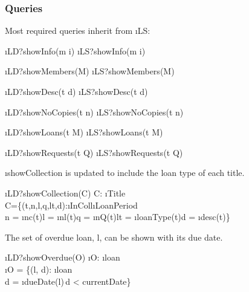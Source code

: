 \documentclass[12pt,a4paper]{article}
\begin{document}
\subsubsection*{Queries}

\noindent Most required queries inherit from \i{LS}:
\begin{showspecs}
	\begin{spec}{\i{LD?showInfo(m \to i)}}
		\i{LS?showInfo(m \to i)}
	\end{spec}
	\showbeside
	\begin{spec}{\i{LD?showMembers(\to M)}}
		\i{LS?showMembers(\to M)}
	\end{spec}
	\showmore
	\begin{spec}{\i{LD?showDesc(t \to d)}}
		\i{LS?showDesc(t \to d)}
	\end{spec}
	\showbeside
	\begin{spec}{\i{LD?showNoCopies(t \to n)}}
		\i{LS?showNoCopies(t \to n)}
	\end{spec}
	\showmore
	\begin{spec}{\i{LD?showLoans(t \to M)}}
		\i{LS?showLoans(t \to M)}
	\end{spec}
	\showbeside
	\begin{spec}{\i{LD?showRequests(t \to Q)}}
		\i{LS?showRequests(t \to Q)}
	\end{spec}
    
\end{showspecs}

\bigskip\noindent \i{showCollection} is updated to include the loan type of each title.
\begin{showspecs}
    \begin{spec}{\i{LD?showCollection(\to C)}}
        C: \i{Title}\pfun{}\times{}\times{}\times{}\\
        C\!=\{(t,n,l,q,lt,d):\i{InColl}\times{}\times{}\times{}\times\i{LoanPeriod}\times{}\bullet\\
        \hspace{1cm} n = \i{nc}(t)\wedge l = \i{nl}(t)\wedge q = \i{nQ}(t)\wedge lt = \i{loanType(t)}\wedge d = \i{desc}(t)\}
    \end{spec}
\end{showspecs}

\bigskip\noindent The set of overdue loan, l, can be shown with its due date.
\begin{showspecs}
    \begin{spec}{\i{LD?showOverdue(\to O)}}
        \i{O}: \i{loan}\pfun{}\\
        \i{O} = \{(l, d): \i{loan}\times {}\, \bullet\\
        \hspace{1cm} d = \i{dueDate}(l)\,\wedge d < currentDate\}
    \end{spec}
\end{showspecs}
\end{document}
